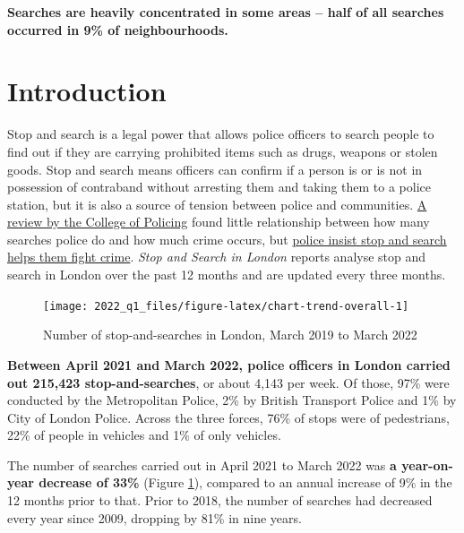 \documentclass[
  a4paper,
  twoside, 11pt]{article}
\begin{document}
\textbf{\sffamily Searches are heavily concentrated in some areas -- half of all searches occurred in 9\% of neighbourhoods.}

\hypertarget{introduction}{%
\section{Introduction}\label{introduction}}

Stop and search is a legal power that allows police officers to search people to find out if they are carrying prohibited items such as drugs, weapons or stolen goods. Stop and search means officers can confirm if a person is or is not in possession of contraband without arresting them and taking them to a police station, but it is also a source of tension between police and communities. \href{https://whatworks.college.police.uk/Research/Documents/SS_and_crime_report.pdf}{A review by the College of Policing} found little relationship between how many searches police do and how much crime occurs, but \href{https://www.met.police.uk/advice/advice-and-information/st-s/stop-and-search/why-we-use-stop-and-search/}{police insist stop and search helps them fight crime}. \emph{Stop and Search in London} reports analyse stop and search in London over the past 12 months and are updated every three months.



\begin{figure}[bh]

{\centering \texttt{[image: 2022\_q1\_files/figure-latex/chart-trend-overall-1]} 

}

\caption{Number of stop-and-searches in London, March 2019 to March 2022}\label{fig:chart-trend-overall}
\end{figure}

\textbf{Between April 2021 and March 2022, police officers in London carried out 215,423 stop-and-searches}, or about 4,143 per week. Of those, 97\% were conducted by the Metropolitan Police, 2\% by British Transport Police and 1\% by City of London Police. Across the three forces, 76\% of stops were of pedestrians, 22\% of people in vehicles and 1\% of only vehicles.

The number of searches carried out in April 2021 to March 2022 was \textbf{a year-on-year decrease of 33\%} (Figure \ref{fig:chart-trend-overall}), compared to an annual increase of 9\% in the 12 months prior to that. Prior to 2018, the number of searches had decreased every year since 2009, dropping by 81\% in nine years.
\end{document}

